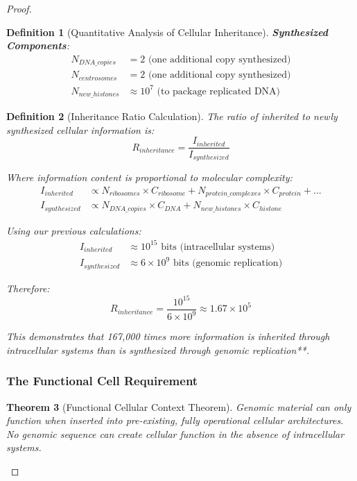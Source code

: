\documentclass[12pt,a4paper]{article}
\newtheorem{theorem}{Theorem}[section]
\newtheorem{definition}[theorem]{Definition}
\begin{document}
\begin{proof}
\begin{definition}[Quantitative Analysis of Cellular Inheritance]
\textbf{Synthesized Components}:
\begin{align}
N_{DNA\_copies} &= 2 \text{ (one additional copy synthesized)} \\
N_{centrosomes} &= 2 \text{ (one additional copy synthesized)} \\
N_{new\_histones} &\approx 10^7 \text{ (to package replicated DNA)}
\end{align}
\end{definition}

\begin{definition}[Inheritance Ratio Calculation]
The ratio of inherited to newly synthesized cellular information is:
\begin{equation}
R_{inheritance} = \frac{I_{inherited}}{I_{synthesized}}
\end{equation}

Where information content is proportional to molecular complexity:
\begin{align}
I_{inherited} &\propto N_{ribosomes} \times C_{ribosome} + N_{protein\_complexes} \times C_{protein} + ... \\
I_{synthesized} &\propto N_{DNA\_copies} \times C_{DNA} + N_{new\_histones} \times C_{histone}
\end{align}

Using our previous calculations:
\begin{align}
I_{inherited} &\approx 10^{15} \text{ bits (intracellular systems)} \\
I_{synthesized} &\approx 6 \times 10^9 \text{ bits (genomic replication)}
\end{align}

Therefore:
\begin{equation}
R_{inheritance} = \frac{10^{15}}{6 \times 10^9} \approx 1.67 \times 10^5
\end{equation}

This demonstrates that 167,000 times more information is inherited through intracellular systems than is synthesized through genomic replication**.
\end{definition}

\subsubsection{The Functional Cell Requirement}

\begin{theorem}[Functional Cellular Context Theorem]
Genomic material can only function when inserted into pre-existing, fully operational cellular architectures. No genomic sequence can create cellular function in the absence of intracellular systems.
\end{theorem}


\end{proof}
\end{document}
